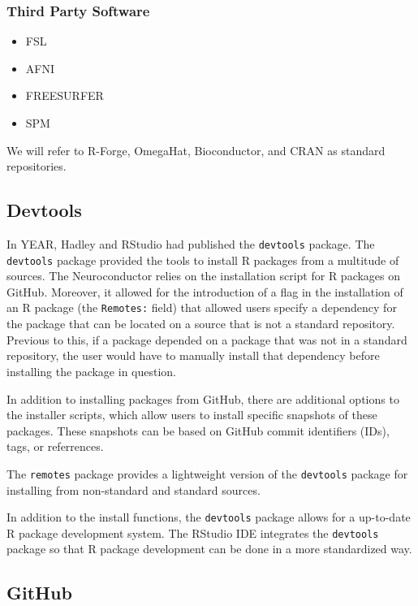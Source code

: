 \documentclass[]{elsarticle} %
\providecommand{\tightlist}{%
  \setlength{\itemsep}{0pt}\setlength{\parskip}{0pt}}
\begin{document}
\subsubsection{Third Party Software}\label{third-party-software}

\begin{itemize}
\tightlist
\item
  FSL
\item
  AFNI
\item
  FREESURFER
\item
  SPM
\end{itemize}

We will refer to R-Forge, OmegaHat, Bioconductor, and CRAN as standard
repositories.

\subsection{Devtools}\label{devtools}

In YEAR, Hadley and RStudio had published the \texttt{devtools} package.
The \texttt{devtools} package provided the tools to install R packages
from a multitude of sources. The Neuroconductor relies on the
installation script for R packages on GitHub. Moreover, it allowed for
the introduction of a flag in the installation of an R package (the
\texttt{Remotes:} field) that allowed users specify a dependency for the
package that can be located on a source that is not a standard
repository. Previous to this, if a package depended on a package that
was not in a standard repository, the user would have to manually
install that dependency before installing the package in question.

In addition to installing packages from GitHub, there are additional
options to the installer scripts, which allow users to install specific
snapshots of these packages. These snapshots can be based on GitHub
commit identifiers (IDs), tags, or referrences.

The \texttt{remotes} package provides a lightweight version of the
\texttt{devtools} package for installing from non-standard and standard
sources.

In addition to the install functions, the \texttt{devtools} package
allows for a up-to-date R package development system. The RStudio IDE
integrates the \texttt{devtools} package so that R package development
can be done in a more standardized way.

\subsection{GitHub}\label{github}
\end{document}
